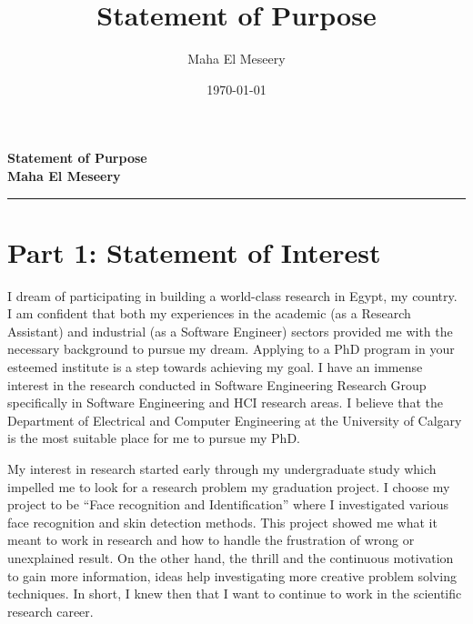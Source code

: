 \documentclass[12pt]{article}%
\title{Statement of Purpose}
\author{Maha El Meseery }
\date{\today}
\begin{document}
\large
 \begin{center}
\textbf{ Statement of Purpose \\ Maha El Meseery } \hrule
\end{center}
\normalsize

\section*{Part 1: Statement of Interest}

 I dream of participating in building a world-class research in Egypt, my country. I am confident that both my experiences in the academic (as a Research Assistant) and industrial (as a Software Engineer) sectors provided me with the necessary background to pursue my dream. Applying to a PhD program in your esteemed institute is a step towards achieving my goal. I have an immense interest in the research conducted in Software Engineering Research Group specifically in Software Engineering and HCI research areas. I believe that the Department of Electrical and Computer Engineering at the University of Calgary is the most suitable place for me to pursue my PhD.

My interest in research started early through my undergraduate study which impelled me to look for a research problem my graduation project. I choose my project to be ``Face recognition and Identification'' where I investigated various face recognition and skin detection methods. This project showed me what it meant to work in research and how to handle the frustration of wrong or unexplained result. On the other hand, the thrill and the continuous motivation to gain more information, ideas help investigating more creative problem solving techniques. In short, I knew then that I want to continue to work in the scientific research career.
\end{document}
